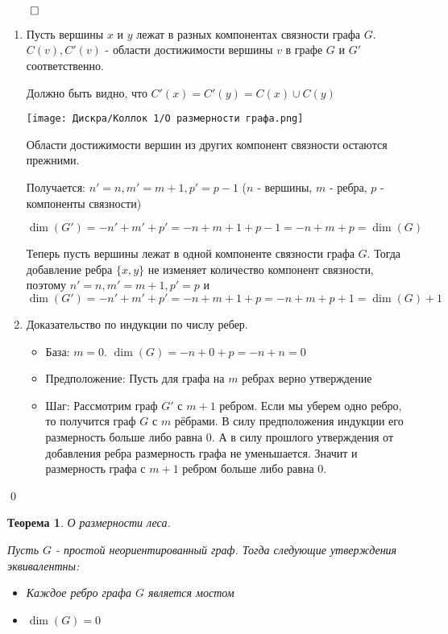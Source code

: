 \documentclass[a4paper,12pt,leqno]{article}
\theoremstyle{plain} %
\newtheorem{theorem}{Теорема}
\theoremstyle{definition} %
\renewenvironment{proof}{$\qed$}{{\qed}} %
\begin{document}
\begin{proof}
    
    \begin{enumerate}
        \item Пусть вершины $x$ и $y$ лежат в разных компонентах связности графа $G$. $C(v), C'(v)$ - области достижимости вершины $v$ в графе $G$ и $G'$ соответственно.
    
        Должно быть видно, что $C'(x) = C'(y) = C(x) \cup C(y)$
    
        \texttt{[image: Дискра/Коллок 1/О размерности графа.png]}
    
        Области достижимости вершин из других компонент связности остаются прежними.
    
        Получается: $n' = n, m' = m + 1, p' = p - 1$ ($n$ - вершины, $m$ - ребра, $p$ - компоненты связности)
    
        $\dim(G') = -n' + m' + p' = -n + m + 1 + p - 1 = -n + m + p = \dim(G)$
    
        Теперь пусть вершины лежат в одной компоненте связности графа $G$. Тогда добавление ребра $\{x, y\}$ не изменяет количество компонент связности, поэтому $n' = n, m' = m + 1, p' = p$ и $\dim(G') = -n' + m' + p' = -n + m + 1 + p = -n + m + p + 1 = \dim(G) + 1$
        
        \item Доказательство по индукции по числу ребер.
        
        \begin{itemize}
            \item База: $m = 0$. $\dim(G) = -n + 0 + p = -n + n = 0$
            
            \item Предположение: Пусть для графа на $m$ ребрах верно утверждение
            
            \item Шаг: Рассмотрим граф $G'$ с $m + 1$ ребром. Если мы уберем одно ребро, то получится граф $G$ с $m$ рёбрами. В силу предположения индукции его размерность больше либо равна 0. А в силу прошлого утверждения от добавления ребра размерность графа не уменьшается. Значит и размерность графа с $m + 1$ ребром больше либо равна 0.
        \end{itemize}
    \end{enumerate}
    
    \end{proof}

\begin{theorem}\textit{О размерности леса.}

Пусть $G$ - простой неориентированный граф. Тогда следующие утверждения эквивалентны:

\begin{itemize}
    \item[1)] Каждое ребро графа $G$ является мостом
    
    \item[2)] $\dim(G) = 0$
\end{itemize}

\end{theorem}
\end{document}
